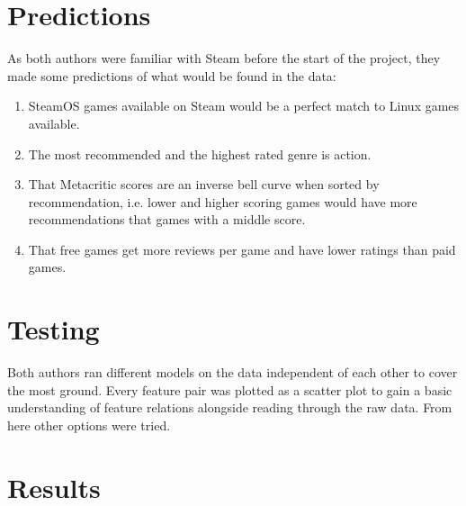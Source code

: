 \documentclass[letterpaper,10pt,twocolumn]{article}
\begin{document}

\section{Predictions}

As both authors were familiar with Steam before the start of the project, they
made some predictions of what would be found in the data:

\begin{enumerate}
    \item SteamOS games available on Steam would be a perfect match to Linux
    games available.

    \item The most recommended and the highest rated genre is action.

    \item That Metacritic scores are an inverse bell curve when sorted by
    recommendation, i.e. lower and higher scoring games would have more
    recommendations that games with a middle score.

    \item That free games get more reviews per game and have lower ratings than
    paid games.
\end{enumerate}



\section{Testing}

Both authors ran different models on the data independent of each other to
cover the most ground. Every feature pair was plotted as a scatter plot to
gain a basic understanding of feature relations alongside reading through the
raw data. From here other options were tried.



\section{Results}
\end{document}

